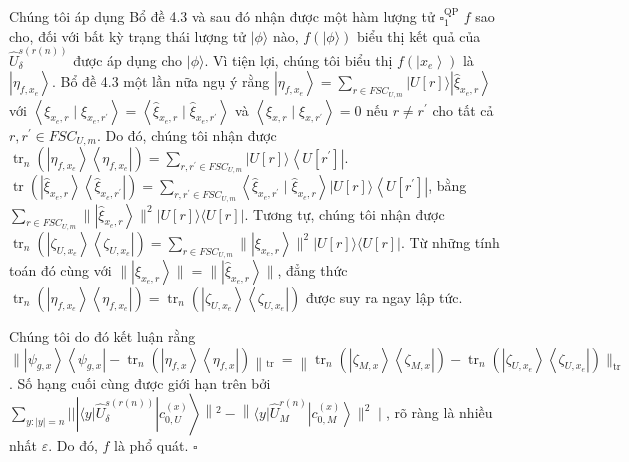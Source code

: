 \documentclass[10pt]{article}
\begin{document}
Chúng tôi áp dụng Bổ đề 4.3 và sau đó nhận được một hàm lượng tử $\square_{1}^{\mathrm{QP}}$ $f$ sao cho, đối với bất kỳ trạng thái lượng tử $|\phi\rangle$ nào, $f(|\phi\rangle)$ biểu thị kết quả của $\widehat{U}_{\delta}^{s(r(n))}$ được áp dụng cho $|\phi\rangle$. Vì tiện lợi, chúng tôi biểu thị $f\left(\left|x_{e}\right\rangle\right)$ là $\left|\eta_{f, x_{e}}\right\rangle$. Bổ đề 4.3 một lần nữa ngụ ý rằng $\left|\eta_{f, x_{e}}\right\rangle=\sum_{r \in F S C_{U, m}}|U[r]\rangle\left|\widehat{\xi}_{x_{e}, r}\right\rangle$ với $\left\langle\xi_{x_{e}, r} \mid \xi_{x_{e}, r^{\prime}}\right\rangle=\left\langle\widehat{\xi}_{x_{e}, r} \mid \widehat{\xi}_{x_{e}, r^{\prime}}\right\rangle$ và $\left\langle\xi_{x, r} \mid \xi_{x, r^{\prime}}\right\rangle=0$ nếu $r \neq r^{\prime}$ cho tất cả $r, r^{\prime} \in F S C_{U, m}$. Do đó, chúng tôi nhận được $\operatorname{tr}_{n}\left(\left|\eta_{f, x_{e}}\right\rangle\left\langle\eta_{f, x_{e}}\right|\right)=\sum_{r, r^{\prime} \in F S C_{U, m}}|U[r]\rangle\left\langle U\left[r^{\prime}\right]\right|$. $\operatorname{tr}\left(\left|\widehat{\xi}_{x_{e}, r}\right\rangle\left\langle\widehat{\xi}_{x_{e}, r^{\prime}}\right|\right)=\sum_{r, r^{\prime} \in F S C_{U, m}}\left\langle\widehat{\xi}_{x_{e}, r^{\prime}} \mid \widehat{\xi}_{x_{e}, r}\right\rangle|U[r]\rangle\left\langle U\left[r^{\prime}\right]\right|$, bằng $\sum_{r \in F S C_{U, m}} \|\left|\widehat{\xi}_{x_{e}, r}\right\rangle \|^{2}|U[r]\rangle\langle U[r]|$. Tương tự, chúng tôi nhận được $\operatorname{tr}_{n}\left(\left|\zeta_{U, x_{e}}\right\rangle\left\langle\zeta_{U, x_{e}}\right|\right)=\sum_{r \in F S C_{U, m}} \|\left|\xi_{x_{e}, r}\right\rangle \|^{2}|U[r]\rangle\langle U[r]|$. Từ những tính toán đó cùng với $\|\left|\xi_{x_{e}, r}\right\rangle\|=\|\left|\widehat{\xi}_{x_{e}, r}\right\rangle \|$, đẳng thức $\operatorname{tr}_{n}\left(\left|\eta_{f, x_{e}}\right\rangle\left\langle\eta_{f, x_{e}}\right|\right)=\operatorname{tr}_{n}\left(\left|\zeta_{U, x_{e}}\right\rangle\left\langle\zeta_{U, x_{e}}\right|\right)$ được suy ra ngay lập tức.

Chúng tôi do đó kết luận rằng $\|\left|\psi_{g, x}\right\rangle\left\langle\psi_{g, x}\right|-\operatorname{tr}_{n}\left(\left|\eta_{f, x}\right\rangle\left\langle\eta_{f, x}\right|\right)\left\|_{\text {tr }}=\right\| \operatorname{tr}_{n}\left(\left|\zeta_{M, x}\right\rangle\left\langle\zeta_{M, x}\right|\right)-\operatorname{tr}_{n}\left(\left|\zeta_{U, x_{e}}\right\rangle\left\langle\zeta_{U, x_{e}}\right|\right) \|_{\text {tr }}$. Số hạng cuối cùng được giới hạn trên bởi $\left.\sum_{y:|y|=n}| |\left|\langle y| \widehat{U}_{\delta}^{s(r(n))}\right| c_{0, U}^{(x)}\right\rangle\left\|^{2}-\right\|\langle y| \widehat{U}_{M}^{r(n)}\left|c_{0, M}^{(x)}\right\rangle \|^{2} \mid$, rõ ràng là nhiều nhất $\varepsilon$. Do đó, $f$ là phổ quát. \(\square\)
\end{document}
